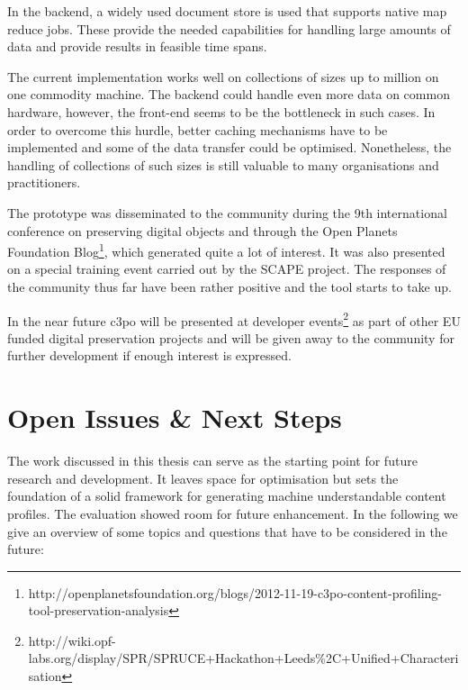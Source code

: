 In the backend, a widely used document store is used that supports native map reduce jobs. These provide the needed capabilities for handling large amounts of data and provide results in feasible time spans.

The current implementation works well on collections of sizes up to million on one commodity machine. The backend could handle even more data on common hardware, however, the front-end seems to be the bottleneck in such cases. In order to overcome this hurdle, better caching mechanisms have to be implemented and some of the data transfer could be optimised.
Nonetheless, the handling of collections of such sizes is still valuable to many organisations and practitioners.

The prototype was disseminated to the community during the 9th international conference on preserving digital objects \cite{petrov-ipres2012} and through the Open Planets Foundation Blog\footnote{http://openplanetsfoundation.org/blogs/2012-11-19-c3po-content-profiling-tool-preservation-analysis}, which generated quite a lot of interest. It was also presented on a special training event carried out by the SCAPE project. The responses of the community thus far have been rather positive and the tool starts to take up.  

In the near future c3po will be presented at developer events\footnote{http://wiki.opf-labs.org/display/SPR/SPRUCE+Hackathon+Leeds\%2C+Unified+Characterisation} as part of other EU funded digital preservation projects and will be given away to the community for further development if enough interest is expressed.

% 

\section{Open Issues \& Next Steps}
The work discussed in this thesis can serve as the starting point for future research and development.
It leaves space for optimisation but sets the foundation of a solid framework for generating machine understandable content profiles. The evaluation showed room for future enhancement. In the following we give an overview of some topics and questions that have to be considered in the future:

